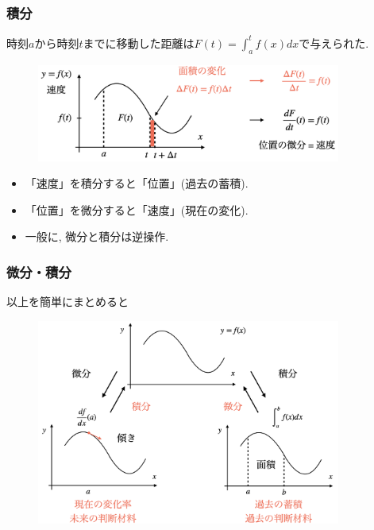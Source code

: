 \documentclass[dvipdfmx,cjk,10.2pt]{beamer}
\theoremstyle{definition}
\begin{document}


\begin{frame}
\frametitle{積分}

時刻$a$から時刻$t$までに移動した距離は$F(t)=\int_a^tf(x)dx$で与えられた. 

 \begin{figure}[htbp]
 \begin{center} 
  \includegraphics[width=100mm]{diff_pos=speed.png}
 \end{center}
\end{figure}


\begin{itemize}
\item 「速度」を積分すると「位置」(過去の蓄積). 
\item 「位置」を微分すると「速度」(現在の変化). 
\item  一般に, 微分と積分は逆操作. 
\end{itemize}

\end{frame}






\begin{frame}
\frametitle{微分・積分}

以上を簡単にまとめると

 \begin{figure}[htbp]
 \begin{center} 
  \includegraphics[width=100mm]{diff_int2.png}
 \end{center}
\end{figure}

\end{frame}
\end{document}

